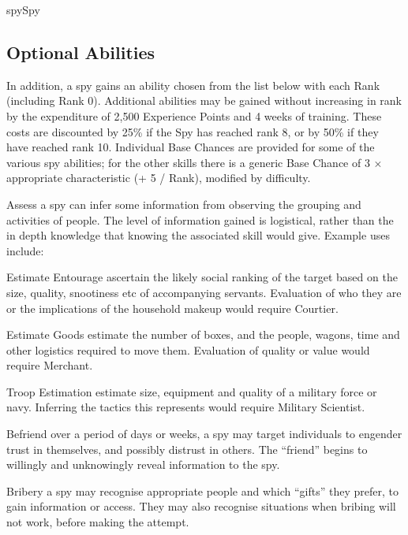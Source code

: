 \begin{Skill}[2.0]{spy}{Spy}
\subsection{Optional Abilities}

In addition, a spy gains an ability chosen from the list below with
each Rank (including Rank 0).  Additional abilities may be gained
without increasing in rank by the expenditure of 2,500 Experience
Points and 4 weeks of training.  These costs are discounted by 25\% if
the Spy has reached rank 8, or by 50\% if they have reached rank
10. Individual Base Chances are provided for some of the various spy
abilities; for the other skills there is a generic Base Chance of 3 ×
appropriate characteristic (+ 5 / Rank), modified by difficulty.

\begin{Description}
\item[Assess] a spy can infer some information from observing the
  grouping and activities of people.  The level of information gained
  is logistical, rather than the in depth knowledge that knowing the
  associated skill would give. Example uses include:
\begin{Itemize}
\item Estimate Entourage ascertain the likely social ranking of the
  target based on the size, quality, snootiness etc of accompanying
  servants.  Evaluation of who they are or the implications of the
  household makeup would require Courtier.

\item Estimate Goods estimate the number of boxes, and the people,
  wagons, time and other logistics required to move them.  Evaluation
  of quality or value would require Merchant.

\item Troop Estimation estimate size, equipment and quality of a
  military force or navy.  Inferring the tactics this represents would
  require Military Scientist.
\end{Itemize}

\item[Befriend] over a period of days or weeks, a spy may target
  individuals to engender trust in themselves, and possibly distrust
  in others. The “friend” begins to willingly and unknowingly reveal
  information to the spy.

\item[Bribery] a spy may recognise appropriate people and which
  “gifts” they prefer, to gain information or access. They may also
  recognise situations when bribing will not work, before making the
  attempt.


\end{Description}
\end{Skill}
